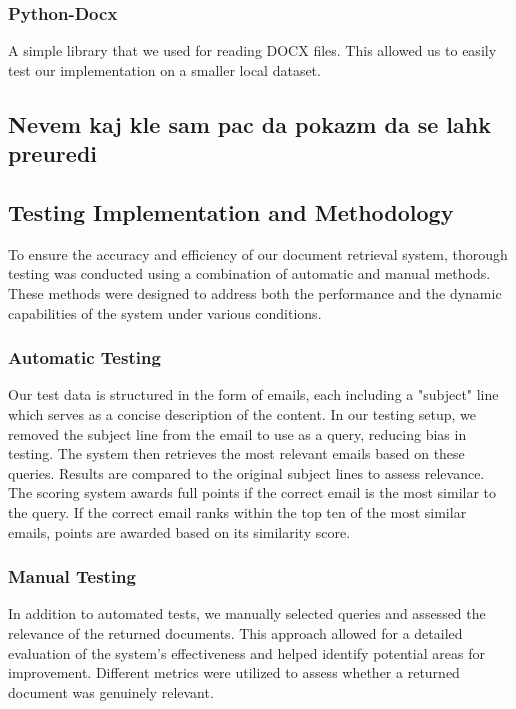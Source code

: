 \documentclass[12pt,a4paper]{article}
\begin{document}
        \bigskip
        \subsubsection{Python-Docx}

        \noindent
        A simple library that we used for reading DOCX files. This allowed us to easily test our implementation on a smaller local dataset.
    
    \subsection{Nevem kaj kle sam pac da pokazm da se lahk preuredi}

\subsection{Testing Implementation and Methodology}
To ensure the accuracy and efficiency of our document retrieval system, thorough testing was conducted using a combination of automatic and manual methods. These methods were designed to address both the performance and the dynamic capabilities of the system under various conditions.

\subsubsection{Automatic Testing}
\noindent
Our test data is structured in the form of emails, each including a "subject" line which serves as a concise description of the content. In our testing setup, we removed the subject line from the email to use as a query, reducing bias in testing. The system then retrieves the most relevant emails based on these queries. Results are compared to the original subject lines to assess relevance. The scoring system awards full points if the correct email is the most similar to the query. If the correct email ranks within the top ten of the most similar emails, points are awarded based on its similarity score.

\subsubsection{Manual Testing}
\noindent
In addition to automated tests, we manually selected queries and assessed the relevance of the returned documents. This approach allowed for a detailed evaluation of the system's effectiveness and helped identify potential areas for improvement. Different metrics were utilized to assess whether a returned document was genuinely relevant.
\end{document}
